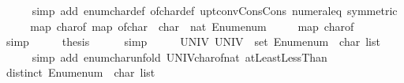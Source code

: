 \begin{isabellebody}
\ \ \ \ \isamarkupfalse%
\ {\isacharparenleft}{\kern0pt}simp\ add{\isacharcolon}{\kern0pt}\ enum{\isacharunderscore}{\kern0pt}char{\isacharunderscore}{\kern0pt}def\ of{\isacharunderscore}{\kern0pt}char{\isacharunderscore}{\kern0pt}def\ upt{\isacharunderscore}{\kern0pt}conv{\isacharunderscore}{\kern0pt}Cons{\isacharunderscore}{\kern0pt}Cons\ numeral{\isacharunderscore}{\kern0pt}{}{\isacharunderscore}{\kern0pt}eq{\isacharunderscore}{\kern0pt}{}\ {\isacharbrackleft}{\kern0pt}symmetric{\isacharbrackright}{\kern0pt}{\isacharparenright}{\kern0pt}\isanewline
\ \ \isamarkupfalse%
\ \isamarkupfalse%
\ {\isachardoublequoteopen}map\ char{\isacharunderscore}{\kern0pt}of\ {\isacharparenleft}{\kern0pt}map\ {\isacharparenleft}{\kern0pt}of{\isacharunderscore}{\kern0pt}char\ {\isacharcolon}{\kern0pt}{\isacharcolon}{\kern0pt}\ char\ {\isasymRightarrow}\ nat{\isacharparenright}{\kern0pt}\ Enum{\isachardot}{\kern0pt}enum{\isacharparenright}{\kern0pt}\ {\isacharequal}{\kern0pt}\isanewline
\ \ \ \ map\ char{\isacharunderscore}{\kern0pt}of\ {\isacharbrackleft}{\kern0pt}{}{\isachardot}{\kern0pt}{\isachardot}{\kern0pt}{\isacharless}{\kern0pt}{}{}{}{\isacharbrackright}{\kern0pt}{\isachardoublequoteclose}\isanewline
\ \ \ \ \isamarkupfalse%
\ simp\isanewline
\ \ \isamarkupfalse%
\ \isamarkupfalse%
\ {\isacharquery}{\kern0pt}thesis\isanewline
\ \ \ \ \isamarkupfalse%
\ simp\isanewline
{}\isamarkupfalse%
%
\endisatagproof
{\isafoldproof}%
%
\isadelimproof
\isanewline
%
\endisadelimproof
\isanewline
{}\isamarkupfalse%
%
\isadelimproof
\ %
\endisadelimproof
%
\isatagproof
{}\isamarkupfalse%
\isanewline
\ \ \isamarkupfalse%
\ UNIV{\isacharcolon}{\kern0pt}\ {\isachardoublequoteopen}UNIV\ {\isacharequal}{\kern0pt}\ set\ {\isacharparenleft}{\kern0pt}Enum{\isachardot}{\kern0pt}enum\ {\isacharcolon}{\kern0pt}{\isacharcolon}{\kern0pt}\ char\ list{\isacharparenright}{\kern0pt}{\isachardoublequoteclose}\isanewline
\ \ \ \ \isamarkupfalse%
\ {\isacharparenleft}{\kern0pt}simp\ add{\isacharcolon}{\kern0pt}\ enum{\isacharunderscore}{\kern0pt}char{\isacharunderscore}{\kern0pt}unfold\ UNIV{\isacharunderscore}{\kern0pt}char{\isacharunderscore}{\kern0pt}of{\isacharunderscore}{\kern0pt}nat\ atLeast{}LessThan{\isacharparenright}{\kern0pt}\isanewline
\ \ \isamarkupfalse%
\ {\isachardoublequoteopen}distinct\ {\isacharparenleft}{\kern0pt}Enum{\isachardot}{\kern0pt}enum\ {\isacharcolon}{\kern0pt}{\isacharcolon}{\kern0pt}\ char\ list{\isacharparenright}{\kern0pt}{\isachardoublequoteclose}\isanewline

\end{isabellebody}

